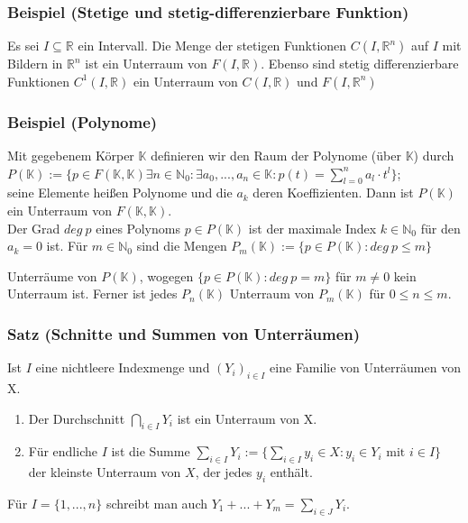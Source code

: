 \subsubsection{Beispiel (Stetige und stetig-differenzierbare Funktion)}
Es sei $I\subseteq \mathbb{R}$ ein Intervall. Die Menge der stetigen Funktionen $C(I,\mathbb{R}^n)$ auf $I$ mit Bildern in $\mathbb{R}^n$ ist ein Unterraum von $F(I,\mathbb{R})$. Ebenso sind stetig differenzierbare Funktionen $C^1(I,\mathbb{R})$ ein Unterraum von $C(I,\mathbb{R})$ und $F(I,\mathbb{R}^n)$
\subsubsection{Beispiel (Polynome)}
Mit gegebenem Körper $\mathbb{K}$ definieren wir den Raum der Polynome (über $\mathbb{K}$) durch \\$P(\mathbb{K}) := \{p\in F(\mathbb{K},\mathbb{K}) \exists n\in\mathbb{N}_0: \exists a_0, ..., a_n \in \mathbb{K} : p(t)=\sum^{n}_{l=0} a_l \cdot t^l\}$;\\
seine Elemente heißen Polynome und die $a_k$ deren Koeffizienten. Dann ist $P(\mathbb{K})$ ein Unterraum von $F(\mathbb{K},\mathbb{K})$.\\
Der Grad $deg\ p$ eines Polynoms $p\in P(\mathbb{K})$ ist der maximale Index $k\in\mathbb{N}_0$ für den $a_k=0$ ist. Für $m\in\mathbb{N}_0$ sind die Mengen $P_m(\mathbb{K}) := \{p\in P(\mathbb{K}):deg\ p \le m\}$

Unterräume von $P(\mathbb{K})$, wogegen $\{p\in P(\mathbb{K}): deg\ p =m\}$ für $m\neq 0$ kein Unterraum ist. Ferner ist jedes $P_n(\mathbb{K})$ Unterraum von $P_m(\mathbb{K})$ für $0\le n\le m$.
\subsubsection{Satz (Schnitte und Summen von Unterräumen)}
Ist $I$ eine nichtleere Indexmenge und $(Y_i)_{i\in I}$ eine Familie von Unterräumen von X.
\begin{enumerate}
\item Der Durchschnitt $\displaystyle\bigcap_{i\in I} Y_i$ ist ein Unterraum von X.
\item Für endliche $I$ ist die Summe $\displaystyle\sum_{i\in I}Y_i := \{\sum_{i\in I} y_i\in X: y_i\in Y_i \text{ mit } i\in I\}$ der kleinste Unterraum von $X$, der jedes $y_i$ enthält.
\end{enumerate}
Für $I=\{1,...,n\}$ schreibt man auch $\displaystyle Y_1+...+Y_m=\sum_{i\in J} Y_i$.

